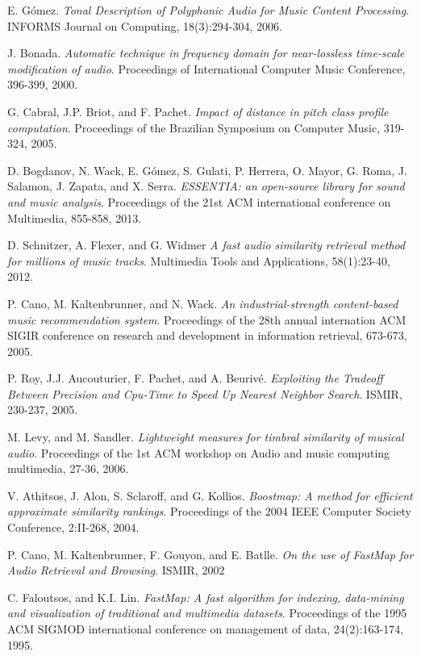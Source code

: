 \documentclass[11pt, oneside, openright]{Thesis} %
\begin{document}
\begin{thebibliography}{99}
E. Gómez.
\textit{Tonal Description of Polyphonic Audio for Music Content Processing}.
INFORMS Journal on Computing, 18(3):294-304, 2006.

J. Bonada.
\textit{Automatic technique in frequency domain for near-lossless time-scale modification of audio}.
Proceedings of International Computer Music Conference, 396-399, 2000.

G. Cabral, J.P. Briot, and F. Pachet. 
\textit{Impact of distance in pitch class profile computation}.
Proceedings of the Brazilian Symposium on Computer Music, 319-324, 2005.

D. Bogdanov, N. Wack, E. Gómez, S. Gulati, P. Herrera, O. Mayor, G. Roma, J. Salamon, J. Zapata, and X. Serra.
\textit{ESSENTIA: an open-source library for sound and music analysis}.
Proceedings of the 21st ACM international conference on Multimedia, 855-858, 2013.

D. Schnitzer, A. Flexer, and G. Widmer
\textit{A fast audio similarity retrieval method for millions of music tracks}.
Multimedia Tools and Applications, 58(1):23-40, 2012.

P. Cano, M. Kaltenbrunner, and N. Wack.
\textit{An industrial-strength content-based music recommendation system}.
Proceedings of the 28th annual internation ACM SIGIR conference on research and development in information retrieval, 673-673, 2005.

P. Roy, J.J. Aucouturier, F. Pachet, and A. Beurivé.
\textit{Exploiting the Tradeoff Between Precision and Cpu-Time to Speed Up Nearest Neighbor Search}.
ISMIR, 230-237, 2005.

M. Levy, and M. Sandler.
\textit{Lightweight measures for timbral similarity of musical audio}.
Proceedings of the 1st ACM workshop on Audio and music computing multimedia, 27-36, 2006.

V. Athitsos, J. Alon, S. Sclaroff, and G. Kollios.
\textit{Boostmap: A method for efficient approximate similarity rankings}.
Proceedings of the 2004 IEEE Computer Society Conference, 2:II-268, 2004.

P. Cano, M. Kaltenbrunner, F. Gouyon, and E. Batlle.
\textit{On the use of FastMap for Audio Retrieval and Browsing}.
ISMIR, 2002

C. Faloutsos, and K.I. Lin. 
\textit{FastMap: A fast algorithm for indexing, data-mining and visualization of traditional and multimedia datasets}.
Proceedings of the 1995 ACM SIGMOD international conference on management of data, 24(2):163-174, 1995.


\end{thebibliography}
\end{document}

